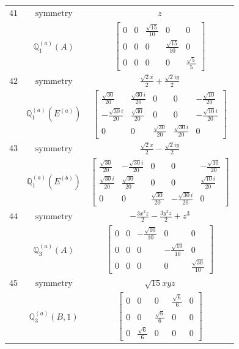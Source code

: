 \documentclass[fleqn,8pt,landscape]{jsarticle}
\begin{document}
\begin{longtable}{ccc}
$ 41 $ & $ \text{symmetry} $ & $ z $ \\
$  $ & $ \mathbb{Q}_{1}^{(a)}(A) $ & $ \begin{bmatrix} 0 & 0 & \frac{\sqrt{15}}{10} & 0 & 0 \\ 0 & 0 & 0 & \frac{\sqrt{15}}{10} & 0 \\ 0 & 0 & 0 & 0 & \frac{\sqrt{5}}{5} \end{bmatrix} $ \\ \hline
$ 42 $ & $ \text{symmetry} $ & $ \frac{\sqrt{2} x}{2} + \frac{\sqrt{2} i y}{2} $ \\
$  $ & $ \mathbb{Q}_{1}^{(a)}(E^{(a)}) $ & $ \begin{bmatrix} \frac{\sqrt{30}}{20} & \frac{\sqrt{30} i}{20} & 0 & 0 & - \frac{\sqrt{10}}{20} \\ - \frac{\sqrt{30} i}{20} & \frac{\sqrt{30}}{20} & 0 & 0 & - \frac{\sqrt{10} i}{20} \\ 0 & 0 & \frac{\sqrt{30}}{20} & \frac{\sqrt{30} i}{20} & 0 \end{bmatrix} $ \\ \hline
$ 43 $ & $ \text{symmetry} $ & $ \frac{\sqrt{2} x}{2} - \frac{\sqrt{2} i y}{2} $ \\
$  $ & $ \mathbb{Q}_{1}^{(a)}(E^{(b)}) $ & $ \begin{bmatrix} \frac{\sqrt{30}}{20} & - \frac{\sqrt{30} i}{20} & 0 & 0 & - \frac{\sqrt{10}}{20} \\ \frac{\sqrt{30} i}{20} & \frac{\sqrt{30}}{20} & 0 & 0 & \frac{\sqrt{10} i}{20} \\ 0 & 0 & \frac{\sqrt{30}}{20} & - \frac{\sqrt{30} i}{20} & 0 \end{bmatrix} $ \\ \hline
$ 44 $ & $ \text{symmetry} $ & $ - \frac{3 x^{2} z}{2} - \frac{3 y^{2} z}{2} + z^{3} $ \\
$  $ & $ \mathbb{Q}_{3}^{(a)}(A) $ & $ \begin{bmatrix} 0 & 0 & - \frac{\sqrt{10}}{10} & 0 & 0 \\ 0 & 0 & 0 & - \frac{\sqrt{10}}{10} & 0 \\ 0 & 0 & 0 & 0 & \frac{\sqrt{30}}{10} \end{bmatrix} $ \\ \hline
$ 45 $ & $ \text{symmetry} $ & $ \sqrt{15} x y z $ \\
$  $ & $ \mathbb{Q}_{3}^{(a)}(B,1) $ & $ \begin{bmatrix} 0 & 0 & 0 & \frac{\sqrt{6}}{6} & 0 \\ 0 & 0 & \frac{\sqrt{6}}{6} & 0 & 0 \\ 0 & \frac{\sqrt{6}}{6} & 0 & 0 & 0 \end{bmatrix} $ \\ \hline

\end{longtable}
\end{document}
